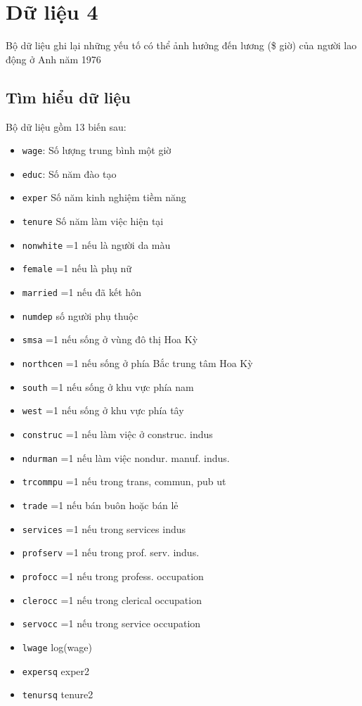 
\section{Dữ liệu 4}
Bộ dữ liệu ghi lại những yếu tố có thể ảnh hưởng đến lương (\$ giờ) của người lao động ở Anh năm 1976

\subsection*{Tìm hiểu dữ liệu}
Bộ dữ liệu gồm 13 biến sau:
\begin{itemize}
	\item \texttt{wage}: Số lượng trung bình một giờ
	\item \texttt{educ}: Số năm đào tạo
	\item \texttt{exper} Số năm kinh nghiệm tiềm năng
	\item \texttt{tenure} Số năm làm việc hiện tại
	\item \texttt{nonwhite} =1 nếu là người da màu
	\item \texttt{female} =1 nếu là phụ nữ
	\item \texttt{married} =1 nếu đã kết hôn
	\item \texttt{numdep} số người phụ thuộc
	\item \texttt{smsa} =1 nếu sống ở vùng đô thị Hoa Kỳ
	\item \texttt{northcen} =1 nếu sống ở phía Bắc trung tâm Hoa Kỳ
	\item \texttt{south} =1 nếu sống ở khu vực phía nam
	\item \texttt{west} =1 nếu sống ở khu vực phía tây
	\item \texttt{construc} =1 nếu làm việc ở construc. indus
	\item \texttt{ndurman} =1 nếu làm việc nondur. manuf. indus.
	\item \texttt{trcommpu} =1 nếu trong trans, commun, pub ut
	\item \texttt{trade} =1 nếu bán buôn hoặc bán lẻ
	\item \texttt{services} =1 nếu trong services indus
	\item \texttt{profserv} =1 nếu trong prof. serv. indus.
	\item \texttt{profocc} =1 nếu trong profess. occupation
	\item \texttt{clerocc} =1 nếu trong clerical occupation
	\item \texttt{servocc} =1 nếu trong  service occupation
	\item \texttt{lwage} log(wage)
	\item \texttt{expersq} exper2
	\item \texttt{tenursq} tenure2
\end{itemize}

